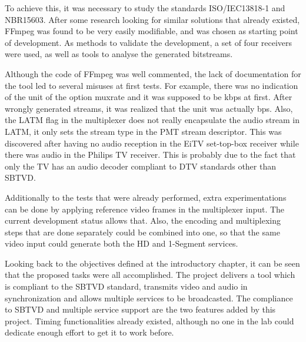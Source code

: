\documentclass[
	12pt,				%
	openright,			%
	twoside,			%
	a4paper,			%
	brazil,
	french,				%
	english
	]{abntex2}
\begin{document}

To achieve this, it was necessary to study the standards ISO/IEC13818-1 and NBR15603. After some research looking for similar solutions that already existed, FFmpeg was found to be very easily modifiable, and was chosen as starting point of development. As methods to validate the development, a set of four receivers were used, as well as tools to analyse the generated bitstreams.


Although the code of FFmpeg was well commented, the lack of documentation for the tool led to several misuses at first tests. For example, there was no indication of the unit of the option muxrate and it was supposed to be kbps at first. After wrongly generated streams, it was realized that the unit was actually bps. Also, the LATM flag in the multiplexer does not really encapsulate the audio stream in LATM, it only sets the stream type in the PMT stream descriptor. This was discovered after having no audio reception in the EiTV set-top-box receiver while there was audio in the Philips TV receiver. This is probably due to the fact that only the TV has an audio decoder compliant to DTV standards other than SBTVD.

	
Additionally to the tests that were already performed, extra experimentations can be done by applying reference video frames in the multiplexer input. The current development status allows that. Also, the encoding and multiplexing steps that are done separately could be combined into one, so that the same video input could generate both the HD and 1-Segment services.
	

Looking back to the objectives defined at the introductory chapter, it can be seen that the proposed tasks were all accomplished. The project delivers a tool which is compliant to the SBTVD standard, transmits video and audio in synchronization and allows multiple services to be broadcasted. The compliance to SBTVD and multiple service support are the two features added by this project. Timing functionalities already existed, although no one in the lab could dedicate enough effort to get it to work before.
\end{document}
